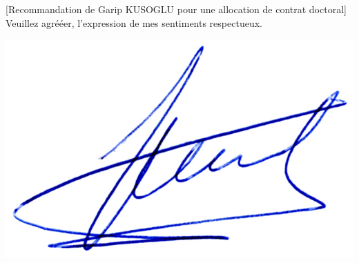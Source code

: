 \documentclass[a4paper,10pt]{article}
\begin{document}
\begin{letter}[Recommandation de Garip \textsc{KUSOGLU} pour une allocation de
  contrat doctoral]
  Veuillez agrééer, l'expression de mes sentiments respectueux.

\begin{flushright}
\includegraphics[width=.20\textwidth]{signgenaud.jpg} 
\end{flushright}

\end{letter}
\end{document}
